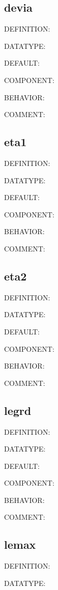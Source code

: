 \subsection{devia}
{\color{red}DEFINITION:}

{\color{green}DATATYPE:}

{\color{blue}DEFAULT:}

{\color{brown}COMPONENT:}

{\color{purple}BEHAVIOR:}

{\color{olive}COMMENT:}

\subsection{eta1}
{\color{red}DEFINITION:}

{\color{green}DATATYPE:}

{\color{blue}DEFAULT:}

{\color{brown}COMPONENT:}

{\color{purple}BEHAVIOR:}

{\color{olive}COMMENT:}

\subsection{eta2}
{\color{red}DEFINITION:}

{\color{green}DATATYPE:}

{\color{blue}DEFAULT:}

{\color{brown}COMPONENT:}

{\color{purple}BEHAVIOR:}

{\color{olive}COMMENT:}

\subsection{legrd}
{\color{red}DEFINITION:}

{\color{green}DATATYPE:}

{\color{blue}DEFAULT:}

{\color{brown}COMPONENT:}

{\color{purple}BEHAVIOR:}

{\color{olive}COMMENT:}

\subsection{lemax}
{\color{red}DEFINITION:}

{\color{green}DATATYPE:}

